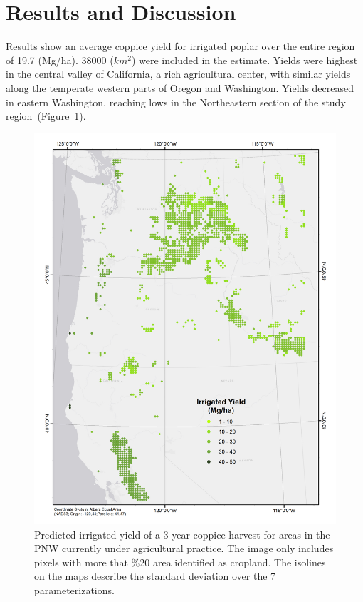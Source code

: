 \documentclass[preprint,12pt]{elsarticle}
\begin{document}
\section{Results and Discussion}

Results show an average coppice yield for irrigated poplar over the
entire region of 19.7 (Mg/ha).  38000 ($km^2$) were included in the
estimate.  Yields were highest in the central valley of California, a
rich agricultural center, with similar yields along the temperate
western parts of Oregon and Washington.  Yields decreased in eastern
Washington, reaching lows in the Northeastern section of the study
region~(Figure~\ref{fig:irrigated_yield}).

\begin{figure}[hp]
  \centering
  \includegraphics[width=1.0\linewidth]{irrigated_yield}
  \caption{Predicted irrigated yield of a 3 year coppice harvest for areas in the \ac{PNW} currently under agricultural practice.  The image only includes pixels with more that \%20 area identified as cropland.  The isolines on the maps describe the standard deviation over the 7 parameterizations.}
  \label{fig:irrigated_yield}
\end{figure}
\end{document}
